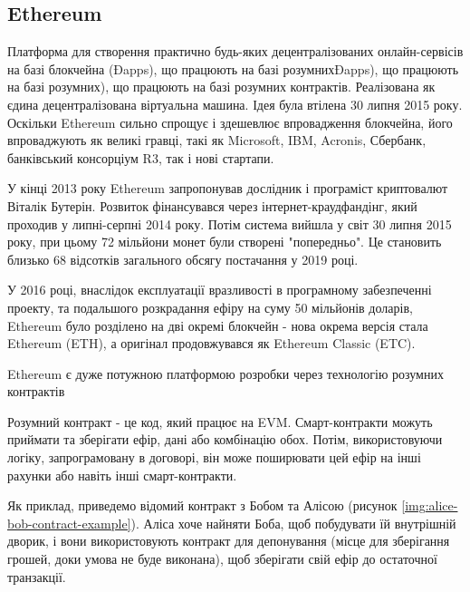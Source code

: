 \documentclass{lib/styles/default-style}
\begin{document}
\pagestyle{default-numbered}

\tableofcontents

\newpage




\subsection{Ethereum}

    Платформа для створення практично будь-яких децентралізованих
    онлайн-сервісів на базі блокчейна (Đapps), що працюють на базі розумнихĐapps), що працюють на базі розумних), що працюють на базі розумних
    контрактів. Реалізована як єдина децентралізована віртуальна машина. Ідея була
    втілена 30 липня 2015 року. Оскільки Ethereum сильно спрощує і здешевлює
    впровадження блокчейна, його впроваджують як великі гравці, такі як Microsoft, IBM, Acronis,
    Сбербанк, банківський консорціум R3, так і нові стартапи.

    У кінці 2013 року Ethereum запропонував дослідник
    і програміст криптовалют Віталік Бутерін. Розвиток фінансувався через інтернет-краудфандінг, який проходив
    у липні-серпні 2014 року. Потім система вийшла у світ 30 липня 2015 року, при цьому 72 мільйони монет були
    створені "попередньо". Це становить близько 68 відсотків загального обсягу постачання у 2019 році.

    У 2016 році,
    внаслідок експлуатації вразливості в програмному забезпеченні проекту, та подальшого розкрадання ефіру на суму 
    50 мільйонів доларів, Ethereum було розділено на дві окремі блокчейн - нова окрема версія стала Ethereum (ETH), а оригінал продовжувався 
    як Ethereum Classic (ETC).

    Ethereum є дуже потужною платформою розробки через технологію розумних контрактів

    Розумний контракт - це код, який працює на EVM.
    Смарт-контракти можуть приймати та зберігати ефір, дані або комбінацію обох.
    Потім, використовуючи логіку, запрограмовану в договорі, він може поширювати
    цей ефір на інші рахунки або навіть інші смарт-контракти.

    Як приклад, приведемо відомий контракт з Бобом та Алісою (рисунок \ref{img:alice-bob-contract-example}). Аліса хоче найняти Боба, щоб побудувати їй внутрішній дворик,
    і вони використовують контракт для депонування (місце для зберігання грошей, доки умова не буде виконана),
    щоб зберігати свій ефір до остаточної транзакції.
\end{document}
